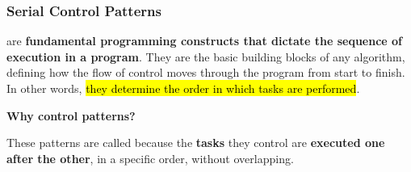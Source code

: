 \subsubsection{Serial Control Patterns}

 are \textbf{fundamental programming constructs that dictate the sequence of execution in a program}. They are the basic building blocks of any algorithm, defining how the flow of control moves through the program from start to finish. In other words, \hl{they determine the order in which tasks are performed}.

\highspace
\begin{flushleft}
  \textcolor{Green3}{ \textbf{Why  control patterns?}}
\end{flushleft}
These patterns are called  because the \textbf{tasks} they control are \textbf{executed one after the other}, in a specific order, without overlapping.

